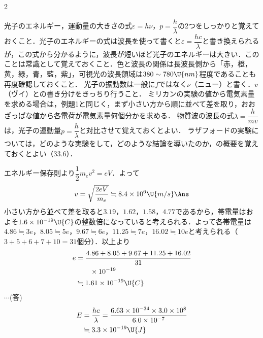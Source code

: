 \newpage

\setlength{\columnseprule}{0.4pt}
\begin{multicols}{2}
\raggedcolumns

\par\nopagebreak
\begin{sisin}
光子のエネルギー，運動量の大きさの式$\varepsilon=h\nu$，$p=\dfrac{h}{\lambda}$の2つをしっかりと覚えておくこと．光子のエネルギーの式は波長を使って書くと$\varepsilon=\dfrac{hc}{\lambda}$と書き換えられるが，この式から分かるように，{\gtfamily 波長が短いほど光子のエネルギーは大きい}．このことは常識として覚えておくこと．色と波長の関係は長波長側から「赤，橙，黄，緑，青，藍，紫」，可視光の波長領域は$380\sim 780\U{nm}$程度であることも再度確認しておくこと．
光子の振動数は一般に$f$ではなく$\nu$（ニュー）と書く．$v$（ヴイ）との書き分けをきっちり行うこと．
ミリカンの実験の値から電気素量を求める場合は，例題1と同じく，まず小さい方から順に並べて差を取り，おおざっぱな値から各電荷が電気素量何個分かを求める．
物質波の波長の式$\lambda=\dfrac{h}{mv}$は，光子の運動量$p=\dfrac{h}{\lambda}$と対比させて覚えておくとよい．
ラザフォードの実験については，どのような実験をして，どのような結論を導いたのか，の概要を覚えておくとよい（33.6）．
\end{sisin}
\KaiHead
\begin{komon}
 エネルギー保存則より$\dfrac{1}{2}m_ev^2=eV$．よって
       \[v=\sqrt{\frac{2eV}{m_e}}\fallingdotseq 8.4\times 10^6\U{m/s}\Ans\]
 小さい方から並べて差を取ると$3.19$，$1.62$，$1.58$，$4.77$であるから，帯電量はおよそ$1.6\times 10^{-19}\U{C}$の整数倍になっていると考えられる．よって各帯電量は$4.86\fallingdotseq 3e$，$8.05\fallingdotseq 5e$，$9.67\fallingdotseq 6e$，$11.25\fallingdotseq 7e$，$16.02\fallingdotseq 10e$と考えられる（$3+5+6+7+10=31$個分）．以上より
       \[\begin{aligned}e&=\frac{4.86+8.05+9.67+11.25+16.02}{31}\\&\qquad\times 10^{-19}\\&\fallingdotseq 1.61\times 10^{-19}\U{C}\end{aligned}\]
       \hspace*{\fill}$\cdots$(答)
 \[\begin{aligned}E&=\frac{hc}{\lambda}=\frac{6.63\times 10^{-34}\times 3.0\times 10^8}{6.0\times 10^{-7}}\\&\fallingdotseq 3.3\times 10^{-19}\U{J}\end{aligned}\]

\end{komon}
\end{multicols}
